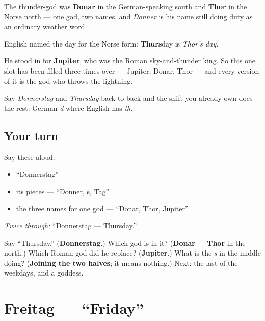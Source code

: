 \begin{cousinweb}
The thunder-god was \textbf{Donar} in the German-speaking south and \textbf{Thor} in the Norse north — one god, two names, and \emph{Donner} is his name still doing duty as an ordinary weather word.

English named the day for the Norse form: \textbf{Thurs}day is \emph{Thor's day}.

He stood in for \textbf{Jupiter}, who was the Roman sky-and-thunder king. So this one slot has been filled three times over — Jupiter, Donar, Thor — and every version of it is the god who throws the lightning.

Say \emph{Donnerstag} and \emph{Thursday} back to back and the shift you already own does the rest: German \emph{d} where English has \emph{th}.
\end{cousinweb}

\subsection*{Your turn}
Say these aloud:

\begin{itemize}
\raggedright
  \item \textquotedblleft{}Donnerstag\textquotedblright{}
  \item its pieces — \textquotedblleft{}Donner, s, Tag\textquotedblright{}
  \item the three names for one god — \textquotedblleft{}Donar, Thor, Jupiter\textquotedblright{}
\end{itemize}

\emph{Twice through:} \textquotedblleft{}Donnerstag — Thursday.\textquotedblright{}

\begin{tcolorbox}[breakable,colback=teal!4,colframe=teal!35!black,title={Before you move on}]
Say \textquotedblleft{}Thursday.\textquotedblright{} (\textbf{Donnerstag}.) Which god is in it? (\textbf{Donar} — \textbf{Thor} in the north.) Which Roman god did he replace? (\textbf{Jupiter}.) What is the \emph{s} in the middle doing? (\textbf{Joining the two halves}; it means nothing.) Next: the last of the weekdays, and a goddess.
\end{tcolorbox}
\section[Freitag]{Freitag — \textquotedblleft{}Friday\textquotedblright{}}

\label{lesson:GE-C07-freitag}



